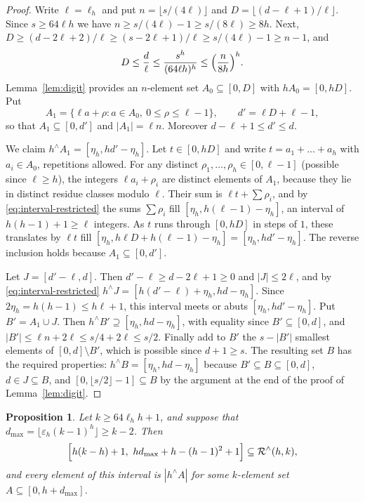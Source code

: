 \documentclass[11pt]{amsart}
\newtheorem{proposition}[theorem]{Proposition}
\theoremstyle{definition}
\theoremstyle{remark}
\numberwithin{equation}{section}
\newcommand{\Rr}{\mathcal{R}^{\wedge}}
\newcommand{\res}[2]{#1^{\wedge}#2}
\begin{document}
\begin{proof}
Write $\ell=\ell_h$ and put $n=\lfloor s/(4\ell)\rfloor$ and $D=\lfloor(d-\ell+1)/\ell\rfloor$. Since $s\ge 64\ell h$ we have $n\ge s/(4\ell)-1\ge s/(8\ell)\ge 8h$. Next, $D\ge(d-2\ell+2)/\ell\ge(s-2\ell+1)/\ell\ge s/(4\ell)-1\ge n-1$, and
\[
D\le\frac d\ell\le\frac{s^h}{(64\ell h)^h}\le\Bigl(\frac{n}{8h}\Bigr)^h .
\]
Lemma~\ref{lem:digit} provides an $n$-element set $A_0\subseteq[0,D]$ with $hA_0=[0,hD]$. Put
\[
A_1=\{\ell a+\rho: a\in A_0,\ 0\le\rho\le\ell-1\},\qquad d'=\ell D+\ell-1,
\]
so that $A_1\subseteq[0,d']$ and $|A_1|=\ell n$. Moreover $d-\ell+1\le d'\le d$.

We claim $\res hA_1=[\eta_h,hd'-\eta_h]$. Let $t\in[0,hD]$ and write $t=a_1+\dots+a_h$ with $a_i\in A_0$, repetitions allowed. For any distinct $\rho_1,\dots,\rho_h\in[0,\ell-1]$ (possible since $\ell\ge h$), the integers $\ell a_i+\rho_i$ are distinct elements of $A_1$, because they lie in distinct residue classes modulo $\ell$. Their sum is $\ell t+\sum\rho_i$, and by \eqref{eq:interval-restricted} the sums $\sum\rho_i$ fill $[\eta_h,h(\ell-1)-\eta_h]$, an interval of $h(h-1)+1\ge\ell$ integers. As $t$ runs through $[0,hD]$ in steps of $1$, these translates by $\ell t$ fill $[\eta_h,h\ell D+h(\ell-1)-\eta_h]=[\eta_h,hd'-\eta_h]$. The reverse inclusion holds because $A_1\subseteq[0,d']$.

Let $J=[d'-\ell,d]$. Then $d'-\ell\ge d-2\ell+1\ge 0$ and $|J|\le 2\ell$, and by \eqref{eq:interval-restricted} $\res hJ=[h(d'-\ell)+\eta_h,hd-\eta_h]$. Since $2\eta_h=h(h-1)\le h\ell+1$, this interval meets or abuts $[\eta_h,hd'-\eta_h]$. Put $B'=A_1\cup J$. Then $\res hB'\supseteq[\eta_h,hd-\eta_h]$, with equality since $B'\subseteq[0,d]$, and $|B'|\le\ell n+2\ell\le s/4+2\ell\le s/2$. Finally add to $B'$ the $s-|B'|$ smallest elements of $[0,d]\setminus B'$, which is possible since $d+1\ge s$. The resulting set $B$ has the required properties: $\res hB=[\eta_h,hd-\eta_h]$ because $B'\subseteq B\subseteq[0,d]$, $d\in J\subseteq B$, and $[0,\lfloor s/2\rfloor-1]\subseteq B$ by the argument at the end of the proof of Lemma~\ref{lem:digit}.
\end{proof}

\begin{proposition}\label{prop:rsmall}
Let $k\ge 64\ell_hh+1$, and suppose that $d_{\max}=\lfloor\varepsilon_h(k-1)^h\rfloor\ge k-2$. Then
\[
\Bigl[h(k-h)+1,\ hd_{\max}+h-(h-1)^2+1\Bigr]\subseteq\Rr(h,k),
\]
and every element of this interval is $|\res hA|$ for some $k$-element set $A\subseteq[0,h+d_{\max}]$.
\end{proposition}
\end{document}
